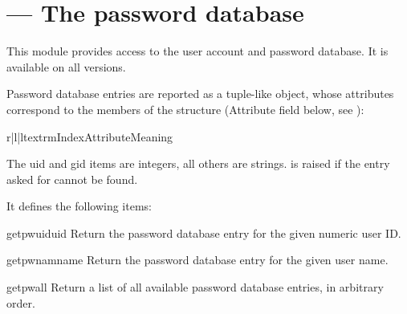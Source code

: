 \section{ ---
         The password database}


This module provides access to the \UNIX{} user account and password
database.  It is available on all \UNIX{} versions.

Password database entries are reported as a tuple-like object, whose
attributes correspond to the members of the  structure
(Attribute field below, see ):

\begin{tableiii}{r|l|l}{textrm}{Index}{Attribute}{Meaning}
\end{tableiii}

The uid and gid items are integers, all others are strings.
 is raised if the entry asked for cannot be found.


It defines the following items:

\begin{funcdesc}{getpwuid}{uid}
Return the password database entry for the given numeric user ID.
\end{funcdesc}

\begin{funcdesc}{getpwnam}{name}
Return the password database entry for the given user name.
\end{funcdesc}

\begin{funcdesc}{getpwall}{}
Return a list of all available password database entries, in arbitrary order.
\end{funcdesc}


\begin{seealso}
\end{seealso}
